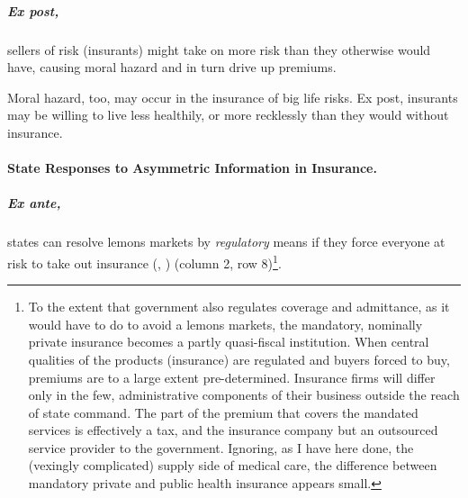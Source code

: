 \subparagraph[Moral Hazard]{Ex post,}  \label{sec:moral-hazard} sellers of risk (insurants) might take on more risk than they otherwise would have, causing moral hazard and in turn drive up premiums. 

Moral hazard, too, may occur in the insurance of big life risks. Ex post, insurants may be willing to live less healthily, or more recklessly than they would without insurance.

\paragraph{State Responses to Asymmetric Information in Insurance.}  \label{sec:state-insurance}

\subparagraph{Ex ante,} states can resolve lemons markets by \emph{regulatory} means if they force everyone at risk to take out insurance (\citealt{Akerlof-1970-aa}, \citealt{Barr})
(column 2, row 8)\footnote{
	To the extent that government also regulates coverage and admittance, as it would have to do to avoid a lemons markets, the mandatory, nominally private insurance becomes a partly quasi-fiscal institution. When central qualities of the products (insurance) are regulated and buyers forced to buy, premiums are to a large extent pre-determined. Insurance firms will differ only in the few, administrative components of their business outside the reach of state command. The part of the premium that covers the mandated services is effectively a tax, and the insurance company but an outsourced service provider to the government. Ignoring, as I have here done, the (vexingly complicated) supply side of medical care, the difference between mandatory private and public health insurance appears small.}.

